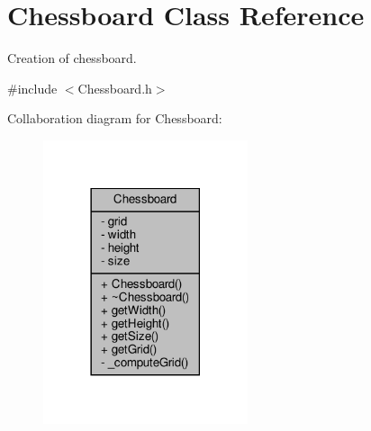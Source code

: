 \hypertarget{class_chessboard}{}\section{Chessboard Class Reference}
\label{class_chessboard}


Creation of chessboard.  




{\ttfamily \#include $<$Chessboard.\+h$>$}



Collaboration diagram for Chessboard\+:\nopagebreak
\begin{figure}[H]
\begin{center}
\leavevmode
\includegraphics[width=170pt]{class_chessboard__coll__graph}
\end{center}
\end{figure}
